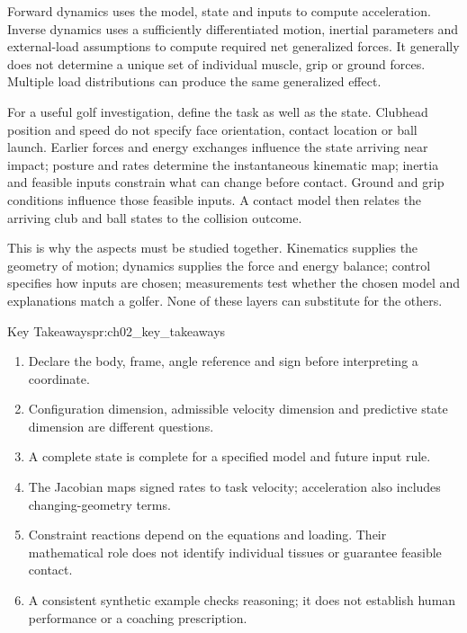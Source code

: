 Forward dynamics uses the model, state and inputs to compute acceleration. Inverse dynamics uses a sufficiently differentiated motion, inertial parameters and external-load assumptions to compute required net generalized forces. It generally does not determine a unique set of individual muscle, grip or ground forces. Multiple load distributions can produce the same generalized effect.

For a useful golf investigation, define the task as well as the state. Clubhead position and speed do not specify face orientation, contact location or ball launch. Earlier forces and energy exchanges influence the state arriving near impact; posture and rates determine the instantaneous kinematic map; inertia and feasible inputs constrain what can change before contact. Ground and grip conditions influence those feasible inputs. A contact model then relates the arriving club and ball states to the collision outcome.

This is why the aspects must be studied together. Kinematics supplies the geometry of motion; dynamics supplies the force and energy balance; control specifies how inputs are chosen; measurements test whether the chosen model and explanations match a golfer. None of these layers can substitute for the others.

\begin{principle}{Key Takeaways}{pr:ch02_key_takeaways}

\begin{enumerate}
\def\labelenumi{\arabic{enumi}.}

\item
  Declare the body, frame, angle reference and sign before interpreting a coordinate.
\item
  Configuration dimension, admissible velocity dimension and predictive state dimension are different questions.
\item
  A complete state is complete for a specified model and future input rule.
\item
  The Jacobian maps signed rates to task velocity; acceleration also includes changing-geometry terms.
\item
  Constraint reactions depend on the equations and loading. Their mathematical role does not identify individual tissues or guarantee feasible contact.
\item
  A consistent synthetic example checks reasoning; it does not establish human performance or a coaching prescription.
\end{enumerate}

\end{principle}

